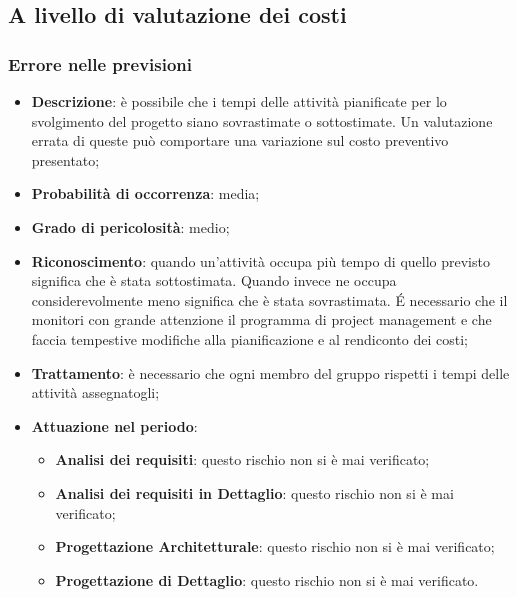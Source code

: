 	\subsection{A livello di valutazione dei costi}
	
		\subsubsection{Errore nelle previsioni}
		\begin{itemize} 
			\item \textbf{Descrizione}: è possibile che i tempi delle attività pianificate per lo svolgimento del progetto siano sovrastimate o sottostimate. Un valutazione errata di queste può comportare una variazione sul costo preventivo presentato;
			\item \textbf{Probabilità di occorrenza}: media;
			\item \textbf{Grado di pericolosità}: medio;
			\item \textbf{Riconoscimento}: quando un'attività occupa più tempo di quello previsto significa che è stata sottostimata. Quando invece ne occupa considerevolmente meno significa che è stata sovrastimata. \'E necessario che il \textit{\Res} monitori con grande attenzione il programma di project management e che faccia tempestive modifiche alla pianificazione e al rendiconto dei costi;
			\item \textbf{Trattamento}: è necessario che ogni membro del gruppo rispetti i tempi delle attività assegnatogli;
			\item \textbf{Attuazione nel periodo}:
			\begin{itemize}
				\item \textbf{Analisi dei requisiti}: questo rischio non si è mai verificato;
				\item \textbf{Analisi dei requisiti in Dettaglio}: questo rischio non si è mai verificato;
				\item \textbf{Progettazione Architetturale}: questo rischio non si è mai verificato;
				\item \textbf{Progettazione di Dettaglio}: questo rischio non si è mai verificato. 
			\end{itemize}
		\end{itemize}